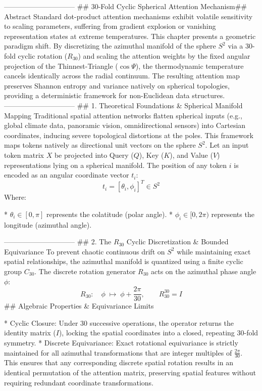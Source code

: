 ------------------------------
## 30-Fold Cyclic Spherical Attention Mechanism## Abstract
Standard dot-product attention mechanisms exhibit volatile sensitivity to scaling parameters, suffering from gradient explosion or vanishing representation states at extreme temperatures. This chapter presents a geometric paradigm shift. By discretizing the azimuthal manifold of the sphere $S^2$ via a 30-fold cyclic rotation ($R_{30}$) and scaling the attention weights by the fixed angular projection of the Thinnest-Triangle ($\cos\Psi$), the thermodynamic temperature cancels identically across the radial continuum. The resulting attention map preserves Shannon entropy and variance natively on spherical topologies, providing a deterministic framework for non-Euclidean data structures.
------------------------------
## 1. Theoretical Foundations & Spherical Manifold Mapping
Traditional spatial attention networks flatten spherical inputs (e.g., global climate data, panoramic vision, omnidirectional sensors) into Cartesian coordinates, inducing severe topological distortions at the poles. This framework maps tokens natively as directional unit vectors on the sphere $S^2$.
Let an input token matrix $X$ be projected into Query ($Q$), Key ($K$), and Value ($V$) representations lying on a spherical manifold. The position of any token $i$ is encoded as an angular coordinate vector $t_i$:
$$t_i = [\theta_i, \phi_i]^T \in S^2$$ 
Where:

* $\theta_i \in [0, \pi]$ represents the colatitude (polar angle).
* $\phi_i \in [0, 2\pi)$ represents the longitude (azimuthal angle).

------------------------------
## 2. The $R_{30}$ Cyclic Discretization & Bounded Equivariance
To prevent chaotic continuous drift on $S^2$ while maintaining exact spatial relationships, the azimuthal manifold is quantized using a finite cyclic group $C_{30}$. The discrete rotation generator $R_{30}$ acts on the azimuthal phase angle $\phi$:
$$R_{30}:\quad \phi \;\longmapsto\; \phi + \frac{2\pi}{30}, \qquad R_{30}^{30} = I$$ 
## Algebraic Properties & Equivariance Limits

* Cyclic Closure: Under 30 successive operations, the operator returns the identity matrix ($I$), locking the spatial coordinates into a closed, repeating 30-fold symmetry.
* Discrete Equivariance: Exact rotational equivariance is strictly maintained for all azimuthal transformations that are integer multiples of $\frac{2\pi}{30}$. This ensures that any corresponding discrete spatial rotation results in an identical permutation of the attention matrix, preserving spatial features without requiring redundant coordinate transformations.

